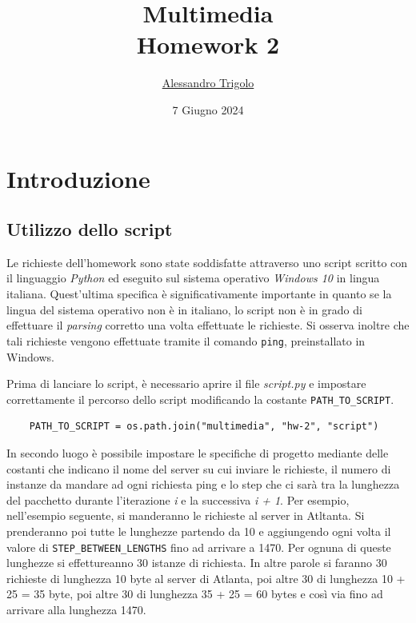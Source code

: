 \title{\vspace{160px} \textbf{\huge{Multimedia}} \\\vspace{17.5px} \LARGE{Homework 2}  \vspace{10px}}
\author{\href{https://github.com/imAlessas}{Alessandro Trigolo}}
\date{7 Giugno 2024}



\maketitle\newpage

\tableofcontents
\vspace{50px}
\listoffigures
\newpage

\section{Introduzione}

\vspace{15px}\subsection{Utilizzo dello script}

Le richieste dell'homework sono state soddisfatte attraverso uno script scritto con il linguaggio \textsl{Python} ed eseguito sul sistema operativo \textsl{Windows 10} in lingua italiana. Quest'ultima specifica è significativamente importante in quanto se la lingua del sistema operativo non è in italiano, lo script non è in grado di effettuare il \textsl{parsing} corretto una volta effettuate le richieste. Si osserva inoltre che tali richieste vengono effettuate tramite il comando \texttt{ping}, preinstallato in Windows.

Prima di lanciare lo script, è necessario aprire il file \textsl{script.py} e impostare correttamente il percorso dello script modificando la costante \texttt{PATH\_TO\_SCRIPT}.
\begin{lstlisting}
    PATH_TO_SCRIPT = os.path.join("multimedia", "hw-2", "script")
\end{lstlisting}

\noindent In secondo luogo è possibile impostare le specifiche di progetto mediante delle costanti che indicano il nome del server su cui inviare le richieste, il numero di instanze da mandare ad ogni richiesta ping e lo step che ci sarà tra la lunghezza del pacchetto durante l'iterazione \textit{i} e la successiva \textit{i + 1}. Per esempio, nell'esempio seguente, si manderanno le richieste al server in Atltanta. Si prenderanno poi tutte le lunghezze partendo da 10 e aggiungendo ogni volta il valore di \texttt{STEP\_BETWEEN\_LENGTHS} fino ad arrivare a 1470. Per ognuna di queste lunghezze si effettureanno 30 istanze di richiesta. In altre parole si faranno 30 richieste di lunghezza 10 byte al server di Atlanta, poi altre 30 di lunghezza 10 + 25 = 35 byte, poi altre 30 di lunghezza 35 + 25 = 60 bytes e così via fino ad arrivare alla lunghezza 1470.

